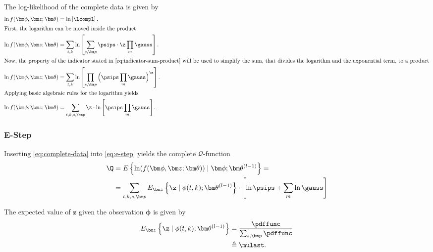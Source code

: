 The log-likelihood of the complete data is given by
\begin{align}
    \ln f(\bm\phi,\bm z; \bm\theta) &= \ln \left [ \lcompl \right ].\\
    \intertext{First, the logarithm can be moved inside the product}
    \ln f(\bm\phi,\bm z; \bm\theta) &=\sum_{t,k}\ln \left [\sum_{s,\bm p}\psips\cdot\z\prod_{m}\gauss\right ].\\
    \intertext{Now, the property of the indicator stated in \eqref{eq:indicator-sum-product} will be used to simplify the sum, that divides the logarithm and the exponential term, to a product}
    \ln f(\bm\phi,\bm z; \bm\theta) &=\sum_{t,k}\ln \left [\prod_{s,\bm p}\Big (\psips\prod_{m}\gauss\Big )^{\z}\right ].\\
    \intertext{Applying basic algebraic rules for the logarithm yields}
    \label{eq:complete-data}
    \ln f(\bm\phi,\bm z; \bm\theta) &=\sum_{t,k,s,\bm p}\z\cdot\ln \left [\psips\prod_{m}\gauss\right ].
\end{align}

\subsubsection*{E-Step}
Inserting \eqref{eq:complete-data} into \eqref{eq:e-step} yields the complete $\mathcal{Q}$-function
\begin{align}
    \Q &=E\left\{\ln(f(\bm\phi,\bm z;\bm\theta))\mid \bm\phi;\bm\theta^{(l-1)}\right\}=\\
       &=\sum_{t,k,s,\bm p}E_{\bm z}\left\{\z\mid\phi(t,k);\bm\theta^{(l-1)}\right\}\cdot\left [ \ln\psips+\sum_{m}\ln\gauss\right]\nonumber\\
\end{align}

The expected value of $\bm z$ given the observation $\bm\phi$ is given by
\begin{align}
\label{eq:responsibility}
    E_{\bm z}\left\{\z\mid\phi(t,k);\bm\theta^{(l-1)}\right\}&=\frac{\pdffunc}{\sum_{s,\bm p}\pdffunc}\\                  
                                                  &\triangleq\mulast .
\end{align}

